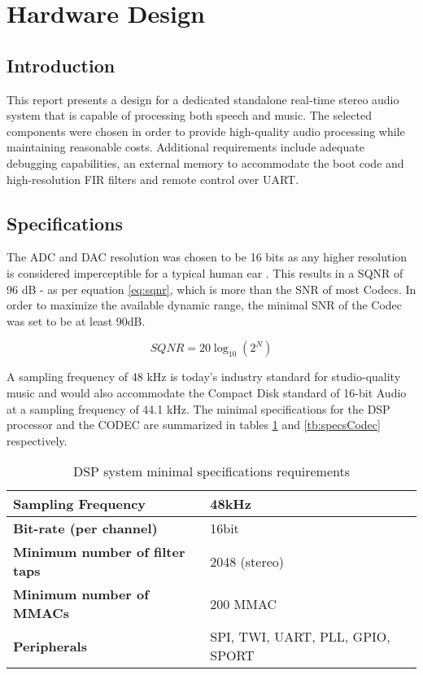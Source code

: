\section{Hardware Design}

\subsection{Introduction}
This report presents a design for a dedicated standalone real-time stereo audio system that is capable of processing both speech and music. The selected components were chosen in order to provide high-quality audio processing while maintaining reasonable costs. Additional requirements include adequate debugging capabilities, an external memory to accommodate the boot code and high-resolution FIR filters and remote control over UART.


\subsection{Specifications}
The ADC and DAC resolution was chosen to be 16 bits as any higher resolution is considered imperceptible for a typical human ear \autocite{jackson2014}. This results in a SQNR of 96 dB - as per equation \ref{eq:sqnr}, which is more than the SNR of most Codecs. In order to maximize the available dynamic range, the minimal SNR of the Codec was set to be at least 90dB.

\begin{equation}\label{eq:sqnr}
SQNR = 20\log_{10}(2^N)    
\end{equation}


A sampling frequency of 48 kHz is today’s industry standard for studio-quality music \autocite{AES48khz} and would also accommodate the Compact Disk standard of 16-bit Audio at a sampling frequency of 44.1 kHz. The minimal specifications for the DSP processor and the CODEC are summarized in tables \ref{tb:specsDSP} and \ref{tb:specsCodec} respectively.




\begin{table}[h]
	\centering
	\begin{tabular}{|l|l|}
		\hline
		\textbf{Sampling Frequency}            & 48kHz                            \\ \hline
		\textbf{Bit-rate (per channel)}         & 16bit                            \\ \hline
		\textbf{Minimum number of filter taps} & 2048 (stereo)                    \\ \hline
		\textbf{Minimum number of MMACs}       & 200 MMAC                          \\ \hline
		\textbf{Peripherals}                   & SPI, TWI, UART, PLL, GPIO, SPORT \\ \hline
	\end{tabular}
	\caption{DSP system minimal specifications requirements}
	\label{tb:specsDSP}
\end{table}

